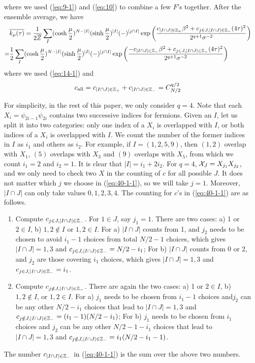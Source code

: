\documentclass[11pt]{article}
\renewcommand{\>}{\rangle}
\newcommand{\<}{\langle}
\begin{document}
where we used (\ref{eq:9-1}) and (\ref{eq:10}) to combine a few
$F$'s together. After the ensemble average, we have 
\begin{align}
&\overline{k_{\mu}(\tau)}  =\frac{1}{2\overline{Z}}\sum_{I}(\cosh\frac{\mu}{2})^{N-|I|}(\sinh\frac{\mu}{2})^{|I|}(-)^{|j\cap I|}\exp\left(\frac{c_{|I\cap J|\in\mathbb{Z}_{+}}\beta^{2}+c_{j\in J,|I\cap J|\in\mathbb{Z}_{-}}(4\tau)^{2}}{2^{q+1}\sigma^{-2}}\right)\nonumber \\
 =& \frac{1}{2}\sum_{I}(\cosh\frac{\mu}{2})^{N-|I|}(\sinh\frac{\mu}{2})^{|I|}(-)^{|j\cap I|}\exp\left(\frac{-c_{|I\cap J|\in\mathbb{Z}_{-}}\beta^{2}+c_{j\in J,|I\cap J|\in\mathbb{Z}_{-}}(4\tau)^{2}}{2^{q+1}\sigma^{-2}}\right)\label{eq:40-1-1}
\end{align}
where we used (\ref{eq:14-1}) and
\begin{equation}
c_{\text{all}}=c_{|I\cap J|\in\mathbb{Z}_{+}}+c_{|I\cap J|\in\mathbb{Z}_{-}}=C_{N/2}^{q/2}
\end{equation}

For simplicity, in the rest of this paper, we only consider $q=4$.
Note that each $X_{i}=\psi_{2i-1}\psi_{2i}$ contains two successive
indices for fermions. Given an $I$, let us split it into two categories:
only one index of a $X_{i}$ is overlapped with $I$, or both indices
of a $X_{i}$ is overlapped with $I$. We count the number of the
former indices in $I$ as $i_{1}$ and others as $i_{2}.$ For example,
if $I=(1,2,5,9)$, then $(1,2)$ overlap with $X_{1}$, $(5)$ overlaps
with $X_{3}$ and $(9)$ overlaps with $X_{5}$, from which we count
$i_{1}=2$ and $i_{2}=1$. It is clear that $|I|=i_{1}+2i_{2}$. For
$q=4$, $\mathcal{X}_{J}=X_{j_{1}}X_{j_{2}}$, and we only need to check two
$X$ in the counting of $c$ for all possible $J$. It does not matter
which $j$ we choose in (\ref{eq:40-1-1}), so we will take $j=1$.
Moreover, $|I\cap J|$ can only take values $0,1,2,3,4$. The counting
for $c$'s in (\ref{eq:40-1-1}) are as follows.
\begin{enumerate}
\item Compute $c_{j\in J,|I\cap J|\in\mathbb{Z}_{-}}$. For $1\in J$, say $j_{1}=1$.
There are two cases: a) 1 or $2\in I$, b) $1,2\notin I$ or $1,2\in I$.
For a) $|I\cap J|$ counts from 1, and $j_{2}$ needs to be chosen
to avoid $i_{1}-1$ choices from total $N/2-1$ choices, which gives
$|I\cap J|=1,3$ and $c_{j\in J,|I\cap J|\in\mathbb{Z}_{-}}=N/2-i_{1}$; For
b) $|I\cap J|$ counts from 0 or 2, and $j_{2}$ are those covering
$i_{1}$ choices, which gives $|I\cap J|=1,3$ and $c_{j\in J,|I\cap J|\in\mathbb{Z}_{-}}=i_{1}$. 
\item Compute $c_{j\notin J,|I\cap J|\in\mathbb{Z}_{-}}$. There are again the two
cases: a) 1 or $2\in I$, b) $1,2\notin I$, or $1,2\in I$. For a)
$j_{1}$ needs to be chosen from $i_{1}-1$ choices and$j_{2}$ can
be any other $N/2-i_{1}$ choices that lead to $|I\cap J|=1,3$ and
$c_{j\notin J,|I\cap J|\in\mathbb{Z}_{-}}=(i_{1}-1)(N/2-i_{1})$; For b) $j_{1}$
needs to be chosen from $i_{1}$ choices and $j_{2}$ can be any other
$N/2-1-i_{1}$ choices that lead to $|I\cap J|=1,3$ and $c_{j\notin J,|I\cap J|\in\mathbb{Z}_{-}}=i_{1}(N/2-i_{1}-1)$.
\end{enumerate}
The number $c_{|I\cap J|\in\mathbb{Z}_{-}}$ in (\ref{eq:40-1-1}) is the
sum over the above two numbers. 
\end{document}

